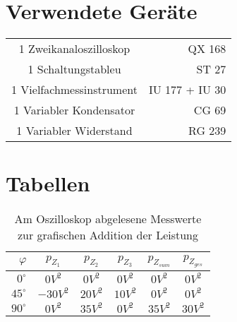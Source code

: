 
\section{Verwendete Geräte}

\begin{table}[H]
\begin{center}
\begin{Large}
\begin{tabular}{| c | r |}
\hline
1 Zweikanaloszilloskop & QX 168\\
1 Schaltungstableu & ST 27\\
1 Vielfachmessinstrument & IU 177 + IU 30\\
1 Variabler Kondensator & CG 69\\
1 Variabler Widerstand & RG 239
\end{tabular}
\end{Large}
\end{center}
\end{table}

\section{Tabellen}

\begin{table}[H]
\caption{Am Oszilloskop abgelesene Messwerte zur grafischen Addition der Leistung}
\label{tab:Momentanleistungswerte}
\begin{center}
\begin{Large}
\begin{tabular}{| r | c | c | c | c | c|}
\hline
\rowcolor{blue}\color{white} $\varphi$ & \color{white}$p_{Z_1}$ & \color{white}$p_{Z_2}$ & \color{white}$p_{Z_3}$  & \color{white}$p_{Z_{sum}}$ & \color{white}$p_{Z_{ges}}$ \\
\hline 
$0^\circ$ & $0V^2$ & $0V^2$ & $0V^2$ & $0V^2$ & $0V^2$ \\
$45^\circ$ & $-30V^2$ & $20V^2$ & $10V^2$ & $0V^2$ & $0V^2$\\
$90^\circ$ & $0V^2$ & $35V^2$ & $0V^2$ & $35V^2$ & $30V^2$ \\
\hline
\end{tabular}
\end{Large}
\end{center}
\end{table}

